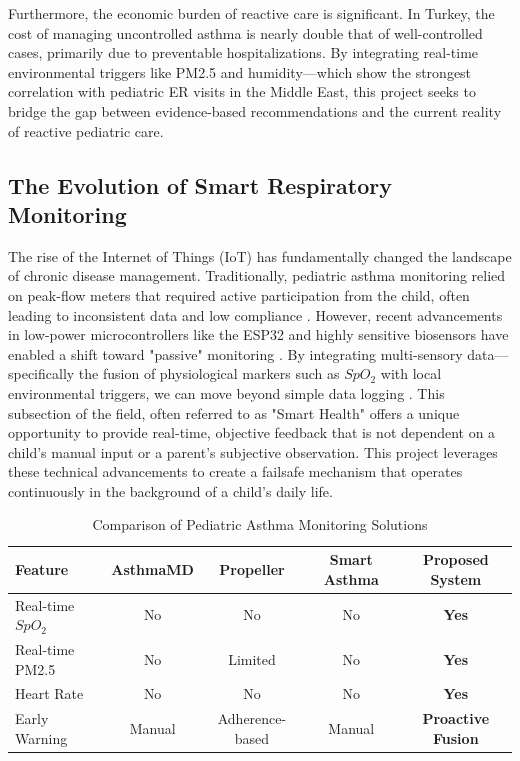 \documentclass[two column]{article}
\begin{document}
Furthermore, the economic burden of reactive care is significant. In Turkey, the cost of managing uncontrolled asthma is nearly double that of well-controlled cases, primarily due to preventable hospitalizations. By integrating real-time environmental triggers like PM2.5 and humidity—which show the strongest correlation with pediatric ER visits in the Middle East,\cite{SaudiAsthma2025} this project seeks to bridge the gap between evidence-based recommendations and the current reality of reactive pediatric care.
\subsection{The Evolution of Smart Respiratory Monitoring}
The rise of the Internet of Things (IoT) has fundamentally changed the landscape of chronic disease management. Traditionally, pediatric asthma monitoring relied on peak-flow meters that required active participation from the child, often leading to inconsistent data and low compliance \cite{Gny2019}. However, recent advancements in low-power microcontrollers like the ESP32 and highly sensitive biosensors have enabled a shift toward "passive" monitoring \cite{Li2018}. 
By integrating multi-sensory data—specifically the fusion of physiological markers such as $SpO_2$ with local environmental triggers, we can move beyond simple data logging \cite{IJERT2021}. This subsection of the field, often referred to as "Smart Health" offers a unique opportunity to provide real-time, objective feedback that is not dependent on a child's manual input or a parent's subjective observation. This project leverages these technical advancements to create a failsafe mechanism that operates continuously in the background of a child's daily life.


\begin{table}[t] 
\caption{Comparison of Pediatric Asthma Monitoring Solutions}
\label{tab:comparison}
\begin{center}
\begin{tabular}{|l|c|c|c|c|}
\hline
\textbf{Feature} & \textbf{AsthmaMD} & \textbf{Propeller} & \textbf{Smart Asthma} & \textbf{Proposed System} \\
\hline
Real-time $SpO_2$ & No & No & No & \textbf{Yes} \\
\hline
Real-time PM2.5 & No & Limited & No & \textbf{Yes} \\
\hline
Heart Rate & No & No & No & \textbf{Yes} \\
\hline
Early Warning & Manual & Adherence-based & Manual & \textbf{Proactive Fusion} \\
\hline
\end{tabular}
\end{center}
\end{table}
\end{document}
